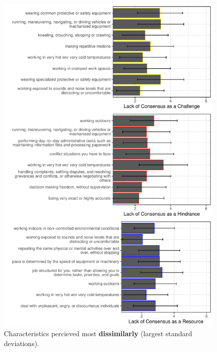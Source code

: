 \documentclass[
  man,mask]{apa7}
\begin{document}
\begin{figure}
\centering
\includegraphics{Submission_files/figure-latex/combinegraphs2-1.pdf}
\caption{\label{fig:combinegraphs2}Characteristics percieved most \textbf{dissimilarly} (largest standard deviations).}
\end{figure}
\end{document}
